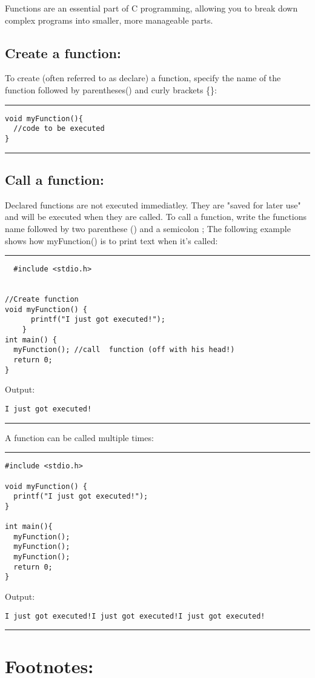 \documentclass[a4paper]{article}
\begin{document}
Functions are an essential part of C programming, allowing you to break down
complex programs into smaller, more manageable parts.

\subsection{Create a function:}
\label{sec:orgf00ad71}
To create (often referred to as declare) a function, specify the name of the
function followed by parentheses() and curly brackets \{\}:

\noindent\rule{\textwidth}{0.5pt}
\begin{verbatim}
void myFunction(){
  //code to be executed
}
\end{verbatim}

\noindent\rule{\textwidth}{0.5pt}
\subsection{Call a function:}
\label{sec:org4170ee0}
Declared functions are not executed immediatley. They are "saved for later use"
and will be executed when they are called.
To call a function, write the functions name followed by two parenthese () and a
semicolon ;
The following example shows how myFunction() is to print text when it's called:

\noindent\rule{\textwidth}{0.5pt}
\begin{verbatim}
  #include <stdio.h>


//Create function
void myFunction() {
      printf("I just got executed!");
    }
int main() {
  myFunction(); //call  function (off with his head!)
  return 0;
}  

\end{verbatim}
Output:
\begin{verbatim}
I just got executed!
\end{verbatim}

\noindent\rule{\textwidth}{0.5pt}
A function can be called multiple times:

\noindent\rule{\textwidth}{0.5pt}
\begin{verbatim}
#include <stdio.h>

void myFunction() {
  printf("I just got executed!");
}

int main(){
  myFunction();
  myFunction();
  myFunction();
  return 0;
}
\end{verbatim}
Output:
\begin{verbatim}
I just got executed!I just got executed!I just got executed!
\end{verbatim}

\noindent\rule{\textwidth}{0.5pt}



























\clearpage
\section{Footnotes:}
\label{sec:org9fc499c}
\end{document}
